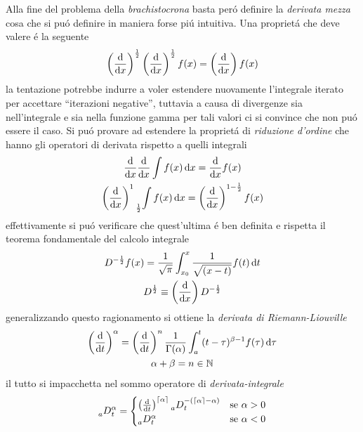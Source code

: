 \begin{multicols*}{3}
  Alla fine del problema della \textit{brachistocrona} basta per\'o definire la \textit{derivata mezza}
  cosa che si pu\'o definire in maniera forse pi\'u intuitiva. Una propriet\'a che deve valere \'e la
  seguente
  \begin{equation}
    \left(\dv{x}\right)^{\frac{1}{2}}\left(\dv{x}\right)^{\frac{1}{2}} f(x) = \left(\dv{x}\right)f(x)
  \end{equation}
  la tentazione potrebbe indurre a voler estendere nuovamente l'integrale iterato per accettare
  ``iterazioni negative'', tuttavia a causa di divergenze sia nell'integrale e sia nella funzione gamma
  per tali valori ci si convince che non pu\'o essere il caso.
  Si pu\'o provare ad estendere la propriet\'a di \textit{riduzione d'ordine} che hanno gli operatori di
  derivata rispetto a quelli integrali
  \begin{equation}
    \begin{gathered}
      \dv{x}\dv{x}\int f(x)\dd{x} = \dv{x}f(x) \\
      \left(\dv{x}\right)^1 \prescript{}{\frac{1}{2}}{\int f(x)\dd{x}} = \left(\dv{x}\right)^{1 - \frac{1}{2}} f(x)
    \end{gathered}
  \end{equation}
  effettivamente si pu\'o verificare che quest'ultima \'e ben definita e rispetta il teorema fondamentale del
  calcolo integrale
  \begin{equation}
    \label{eq:half-operators}
    \begin{gathered}
      D^{-\frac{1}{2}}f(x) = \frac{1}{\sqrt{\pi}} \int_{x_0}^x \frac{1}{\sqrt{(x-t)}} f(t)\dd{t} \\
      D^{\frac{1}{2}} \equiv \left(\dv{x}\right)D^{-\frac{1}{2}}
    \end{gathered}
  \end{equation}
  generalizzando questo ragionamento si ottiene la \textit{derivata di Riemann-Liouville}
  \begin{equation}
    \label{eq:cauchy-formula}
    \begin{gathered}
      \left(\dv{t}\right)^{\alpha} = \left(\dv{t}\right)^n\frac{1}{\Gamma(\alpha)} \int_{a}^t (t-\tau)^{\beta-1}f(\tau)\dd{\tau} \\
      \alpha + \beta = n \in \mathbb{N}
    \end{gathered}
  \end{equation}
  il tutto si impacchetta nel sommo operatore di \textit{derivata-integrale}
  \begin{equation}
    \prescript{}{a}{D}_t^{\alpha} =
    \begin{cases}
      \left(\dv{t}\right)^{\lceil\alpha\rceil}\prescript{}{a}{D}_t^{-(\lceil\alpha\rceil-\alpha)} & \text{se } \alpha > 0 \\
      \prescript{}{a}{D}_t^{\alpha} & \text{se } \alpha < 0
    \end{cases}
  \end{equation}


\end{multicols*}
